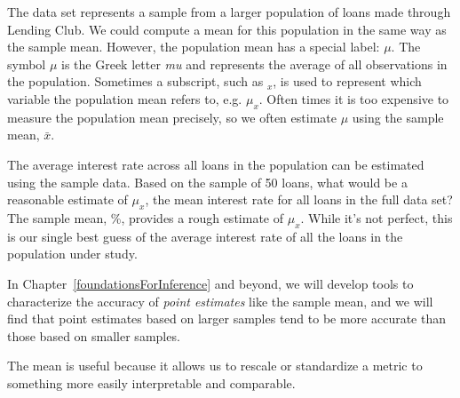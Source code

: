The  data set represents a sample from
a larger population of loans made through Lending Club.
We could compute a mean for this population in the same way
as the sample mean.
However, the population mean has a special label: $\mu$.
The symbol $\mu$ is the Greek letter \emph{mu} and represents
the average of all observations in the population.
Sometimes a subscript, such as $_x$,
is used to represent which variable the population mean
refers to, e.g. $\mu_x$.
Often times it is too expensive to measure the
population mean precisely, so we often estimate
$\mu$ using the sample mean, $\bar{x}$.

\begin{examplewrap}
\begin{nexample}{The average interest rate across all loans
  in the population can be estimated using the sample data.
  Based on the sample of 50 loans,
  what would be a reasonable estimate of $\mu_x$,
  the mean interest rate for all loans in the
  full data set?}
The sample mean, \loanAvg{}\%, provides a rough estimate
of $\mu_x$.
While it's not perfect, this is our single best guess
of the average interest rate of all the loans in the
population under study.

In Chapter~\ref{foundationsForInference} and beyond,
we will develop tools to characterize the accuracy
of \emph{point estimates}
like the sample mean,
and we will find that point estimates
based on larger samples tend to be more accurate than
those based on smaller samples.
\end{nexample}
\end{examplewrap}

The mean is useful because it allows us to
rescale or standardize a metric to something more easily
interpretable and comparable.

